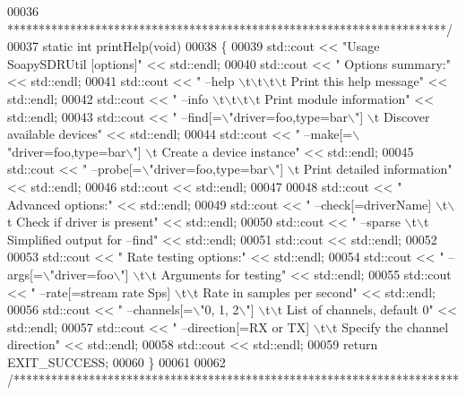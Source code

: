 \begin{DoxyCode}
00036 \textcolor{comment}{ **********************************************************************/}
00037 \textcolor{keyword}{static} \textcolor{keywordtype}{int} printHelp(\textcolor{keywordtype}{void})
00038 \{
00039     std::cout << \textcolor{stringliteral}{"Usage SoapySDRUtil [options]"} << std::endl;
00040     std::cout << \textcolor{stringliteral}{"  Options summary:"} << std::endl;
00041     std::cout << \textcolor{stringliteral}{"    --help \(\backslash\)t\(\backslash\)t\(\backslash\)t\(\backslash\)t Print this help message"} << std::endl;
00042     std::cout << \textcolor{stringliteral}{"    --info \(\backslash\)t\(\backslash\)t\(\backslash\)t\(\backslash\)t Print module information"} << std::endl;
00043     std::cout << \textcolor{stringliteral}{"    --find[=\(\backslash\)"driver=foo,type=bar\(\backslash\)"] \(\backslash\)t Discover available devices"} << std::endl;
00044     std::cout << \textcolor{stringliteral}{"    --make[=\(\backslash\)"driver=foo,type=bar\(\backslash\)"] \(\backslash\)t Create a device instance"} << std::endl;
00045     std::cout << \textcolor{stringliteral}{"    --probe[=\(\backslash\)"driver=foo,type=bar\(\backslash\)"] \(\backslash\)t Print detailed information"} << std::endl;
00046     std::cout << std::endl;
00047 
00048     std::cout << \textcolor{stringliteral}{"  Advanced options:"} << std::endl;
00049     std::cout << \textcolor{stringliteral}{"    --check[=driverName] \(\backslash\)t\(\backslash\)t Check if driver is present"} << std::endl;
00050     std::cout << \textcolor{stringliteral}{"    --sparse             \(\backslash\)t\(\backslash\)t Simplified output for --find"} << std::endl;
00051     std::cout << std::endl;
00052 
00053     std::cout << \textcolor{stringliteral}{"  Rate testing options:"} << std::endl;
00054     std::cout << \textcolor{stringliteral}{"    --args[=\(\backslash\)"driver=foo\(\backslash\)"] \(\backslash\)t\(\backslash\)t Arguments for testing"} << std::endl;
00055     std::cout << \textcolor{stringliteral}{"    --rate[=stream rate Sps] \(\backslash\)t\(\backslash\)t Rate in samples per second"} << std::endl;
00056     std::cout << \textcolor{stringliteral}{"    --channels[=\(\backslash\)"0, 1, 2\(\backslash\)"] \(\backslash\)t\(\backslash\)t List of channels, default 0"} << std::endl;
00057     std::cout << \textcolor{stringliteral}{"    --direction[=RX or TX] \(\backslash\)t\(\backslash\)t Specify the channel direction"} << std::endl;
00058     std::cout << std::endl;
00059     \textcolor{keywordflow}{return} EXIT\_SUCCESS;
00060 \}
00061 
00062 \textcolor{comment}{/***********************************************************************}

\end{DoxyCode}
